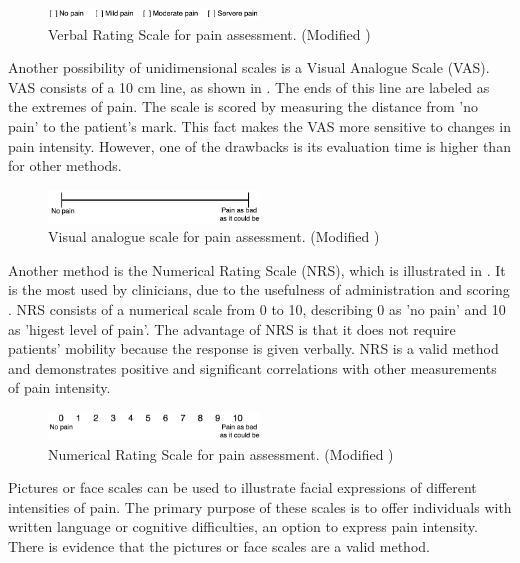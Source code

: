 \begin{figure}[H]
	\includegraphics[width=0.5\textwidth]{figures/VRS.png} 
	\caption{Verbal Rating Scale for pain assessment. (Modified \cite{Jensen2001})}
	\label{fig:VRS}  
\end{figure}   

Another possibility of unidimensional scales is a Visual Analogue Scale (VAS). VAS consists of a 10 cm line, as shown in . The ends of this line are labeled as the extremes of pain. The scale is scored by measuring the distance from 'no pain' to the patient's mark. This fact makes the VAS more sensitive to changes in pain intensity. However, one of the drawbacks is its evaluation time is higher than for other methods.~\cite{Jensen2001} 

\begin{figure}[H]
	\includegraphics[width=0.5\textwidth]{figures/VAS.png} 
	\caption{Visual analogue scale for pain assessment. (Modified \cite{Jensen2001})}
	\label{fig:VAS}  
\end{figure}   

Another method is the Numerical Rating Scale (NRS), which is illustrated in . It is the most used by clinicians, due to the usefulness of administration and scoring \cite{Fillingim2016}. NRS consists of a numerical scale from 0 to 10, describing 0 as 'no pain' and  10 as 'higest level of pain'. The advantage of NRS is that it does not require patients' mobility because the response is given verbally. NRS is a valid method and demonstrates positive and significant correlations with other measurements of pain intensity. \cite{Jensen2001} 

\begin{figure}[H]
	\includegraphics[width=0.5\textwidth]{figures/NRS.png} 
	\caption{Numerical Rating Scale for pain assessment. (Modified \cite{Jensen2001})}
	\label{fig:NRS}  
\end{figure}   

Pictures or face scales can be used to illustrate facial expressions of different intensities of pain. The primary purpose of these scales is to offer individuals with written language or cognitive difficulties, an option to express pain intensity. There is evidence that the pictures or face scales are a valid method. \cite{Jensen2001} 

